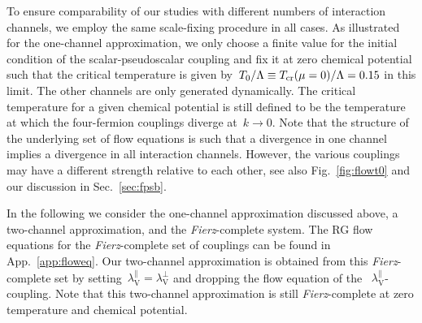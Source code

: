 \documentclass[prd,english,preprintnumbers,amsmath,amssymb,nofootinbib,twocolumn,superscriptaddress]{revtex4-1}
\begin{document}
{To ensure comparability of our studies with different numbers of interaction channels, we employ the same 
{scale-fixing procedure} in all cases. As illustrated for the one-channel approximation, we only 
choose a finite value for the initial condition of the scalar-pseudoscalar coupling and
 fix it at zero chemical potential such that the critical temperature
is {given by~$T_0/\Lambda \equiv T_{\rm cr}(\mu=0)/\Lambda=0.15$ in this} limit. The other channels
are only generated dynamically. 
The critical temperature for a given 
chemical potential is still
defined to be the temperature at which the four-fermion couplings diverge at~$k\to 0$. Note that
the structure of the underlying set of flow equations is such that a divergence in one channel
implies a divergence in all interaction channels. However, the various couplings may have 
a different strength relative to each other, see also Fig.~\ref{fig:flowt0} and our discussion in Sec.~\ref{sec:fpsb}.  

In the following we consider the one-channel approximation discussed above, a two-channel
approximation, and the {\it Fierz}-complete system. The RG flow equations 
for the {\it Fierz}-complete set of couplings can be found in App.~\ref{app:floweq}. 
Our two-channel approximation is obtained from this {\it Fierz}-complete set 
by setting~$\lambda_{\text{V}}^{\parallel}=\lambda_{\text{V}}^{\perp}$ and dropping the flow equation of the 
~$\lambda_{\text{V}}^{\parallel}$-coupling. Note that this two-channel approximation is still {\it Fierz}-complete at
zero temperature and chemical potential.

}
\end{document}
